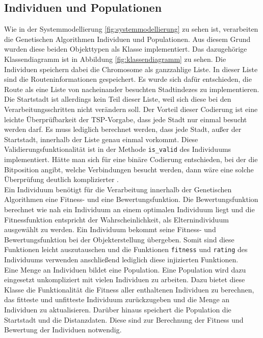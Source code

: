 \subsection{Individuen und Populationen}
Wie in der Systemmodellierung \ref{fig:systemmodellierung} zu sehen ist, verarbeiten die Genetischen Algorithmen Individuen und Populationen. Aus diesem Grund wurden diese beiden Objekttypen als Klasse implementiert. Das dazugehörige Klassendiagramm ist in Abbildung \ref{fig:klassendiagramm} zu sehen.
Die Individuen speichern dabei die Chromosome als ganzzahlige Liste. In dieser Liste sind die Routeninformationen gespeichert. Es wurde sich dafür entschieden, die Route als eine Liste von nacheinander besuchten Stadtindezes zu implementieren. Die Startstadt ist allerdings kein Teil dieser Liste, weil sich diese bei den Verarbeitungsschritten nicht verändern soll.
Der Vorteil dieser Codierung ist eine leichte Überprüfbarkeit der TSP-Vorgabe, dass jede Stadt nur einmal besucht werden darf. Es muss lediglich berechnet werden, dass jede Stadt, außer der Startstadt, innerhalb der Liste genau einmal vorkommt. Diese Validierungsfunktionalität ist in der Methode \texttt{is\_valid} des Individuums implementiert.
Hätte man sich für eine binäre Codierung entschieden, bei der die Bitposition angibt, welche Verbindungen besucht werden, dann wäre eine solche Überprüfung deutlich komplizierter \cite[S. 271-271]{schoeneburg}.\\
Ein Individuum benötigt für die Verarbeitung innerhalb der Genetischen Algorithmen eine Fitness- und eine Bewertungsfunktion. Die Bewertungsfunktion berechnet wie nah ein Individuum an einem optimalen Individuum liegt und die Fitnessfunktion entspricht der Wahrscheinlichkeit, als Elternindividuum ausgewählt zu werden.
Ein Individuum bekommt seine Fitness- und Bewertungsfunktion bei der Objekterstellung übergeben. Somit sind diese Funktionen leicht auszutauschen und die Funktionen \texttt{fitness} und \texttt{rating} des Individuums verwenden anschließend lediglich diese injizierten Funktionen.\\
Eine Menge an Individuen bildet eine Population. Eine Population wird dazu eingesetzt unkompliziert mit vielen Individuen zu arbeiten. Dazu bietet diese Klasse die Funktionalität die Fitness aller enthaltenen Individuen zu berechnen, das fitteste und unfitteste Individuum zurückzugeben und die Menge an Individuen zu aktualisieren.
Darüber hinaus speichert die Population die Startstadt und die Distanzdaten. Diese sind zur Berechnung der Fitness und Bewertung der Individuen notwendig.
